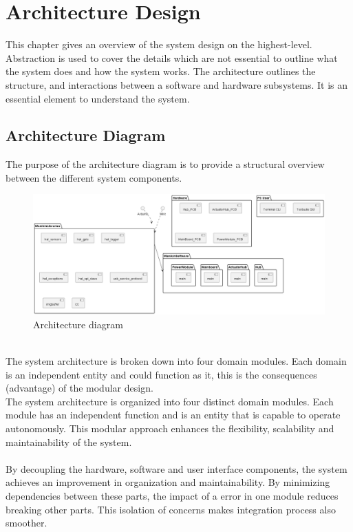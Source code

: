 \chapter{Architecture Design}
\label{chapter:intro}
This chapter gives an overview of the system design on the highest-level. Abstraction is used to cover the details which are not essential to outline what the system does and how the system works. \newline
The architecture outlines the structure, and interactions between a software and hardware subsystems. It is an essential element to understand the system. 

\section {Architecture Diagram}
The purpose of the architecture diagram is to provide a structural overview between the different system components. \\
\begin{figure}[h!]
\includegraphics[scale=0.325]{figures/ArchitectureDiagram.png}
  \caption{Architecture diagram}
\end{figure}\\
The system architecture is broken down into four domain modules. Each domain is an independent entity and could function as it, this is the consequences (advantage) of the modular design.\\
The system architecture is organized into four distinct domain modules. Each module has an independent function and is an entity that is capable to operate autonomously. This modular approach enhances the flexibility, scalability and maintainability of the system. \\\\ 
By decoupling the hardware, software and user interface components, the system achieves an improvement in organization and maintainability. By minimizing dependencies between these parts, the impact of a error in one module reduces breaking other parts. This isolation of concerns makes integration process also smoother. 
